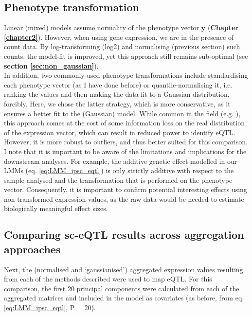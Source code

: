 \subsection{Phenotype transformation}

Linear (mixed) models assume normality of the phenotype vector $\mathbf{y}$ (\textbf{Chapter \ref{chapter2}}).
However, when using gene expression, we are in the presence of count data.
By log-transforming (log2) and normalising (previous section) such counts, the model-fit is improved, yet this approach still remains sub-optimal (see \textbf{section \ref{sec:non_gaussian}}). \\

In addition, two commonly-used phenotype transformations include standardising each phenotype vector (as I have done before) or quantile-normalising it, i.e. ranking the values and then making the data fit to a Gaussian distribution, forcibly.
Here, we chose the latter strategy, which is more conservative, as it ensures a better fit to the (Gaussian) model.
While common in the field (e.g. \cite{aguet2019gtex, kerimov2020eqtl}), this approach comes at the cost of some information loss on the real distribution of the expression vector, which can result in reduced power to identify eQTL.
However, it is more robust to outliers, and thus better suited for this comparison.
I note that it is important to be aware of the limitations and implications for the downstream analyses. 
For example, the additive genetic effect modelled in our LMMs (eq. \eqref{eq:LMM_ipsc_eqtl}) is only strictly additive with respect to the sample analysed and the transformation that is performed on the phenotype vector. 
Consequently, it is important to confirm potential interesting effects using non-transformed expression values, as the raw data would be needed to estimate biologically meaningful effect sizes.

\newpage

\subsection{Comparing sc-eQTL results across aggregation approaches}

Next, the (normalised and `gaussianised') aggregated expression values resulting from each of the methods described were used to map eQTL.
For this comparison, the first 20 principal components were calculated from each of the aggregated matrices and included in the model as covariates (as before, from eq. \eqref{eq:LMM_ipsc_eqtl}, P = 20). \\

